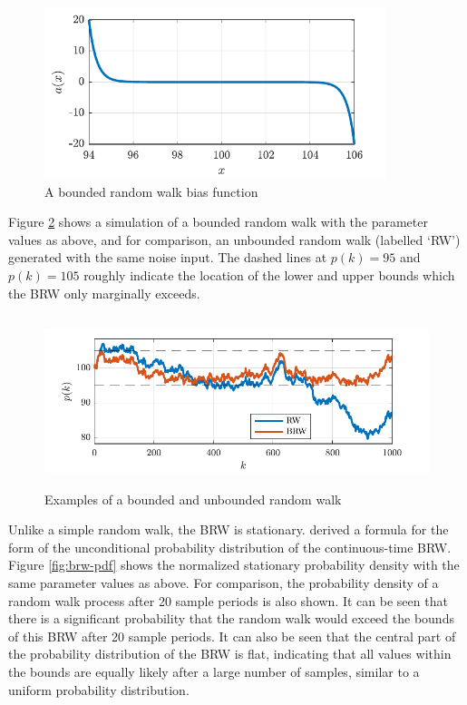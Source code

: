 \begin{figure}[htp]
	\centering
	\includegraphics[height=5cm]{images/brw_a.pdf}
	\caption{A bounded random walk bias function}
	\label{fig:brw-a}
\end{figure}

Figure \ref{fig:brw-sim} shows a simulation of a bounded random walk with the parameter values as above, and for comparison, an unbounded random walk (labelled `RW') generated with the same noise input. The dashed lines at $p(k)=95$ and $p(k)=105$ roughly indicate the location of the lower and upper bounds which the BRW only marginally exceeds.

\begin{figure}[htp]
	\centering
	\includegraphics[height=5cm]{images/brw_sim.pdf}
	\caption{Examples of a bounded and unbounded random walk}
	\label{fig:brw-sim}
\end{figure}

Unlike a simple random walk, the BRW is stationary. \cite{nicolau_stationary_2002} derived a formula for the form of the unconditional probability distribution of the continuous-time BRW. Figure \ref{fig:brw-pdf} shows the normalized stationary probability density with the same parameter values as above. For comparison, the probability density of a random walk process after 20 sample periods is also shown. It can be seen that there is a significant probability that the random walk would exceed the bounds of this BRW after 20 sample periods. It can also be seen that the central part of the probability distribution of the BRW is flat, indicating that all values within the bounds are equally likely after a large number of samples, similar to a uniform probability distribution.

